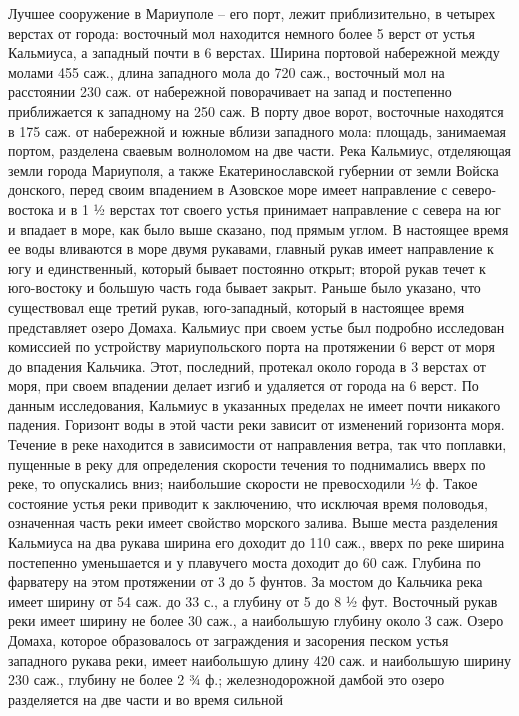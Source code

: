Лучшее сооружение в Мариуполе – его порт, лежит приблизительно, в четырех
верстах от города: восточный мол находится немного более 5 верст от устья
Кальмиуса, а западный почти в 6 верстах. Ширина портовой набережной между
молами 455 саж., длина западного мола до 720 саж., восточный мол на расстоянии
230 саж. от набережной поворачивает на запад и постепенно приближается к
западному на 250 саж. В порту двое  ворот, восточные находятся в 175 саж. от
набережной и южные вблизи западного мола: площадь, занимаемая портом, разделена
сваевым волноломом на две части. Река Кальмиус, отделяющая земли города
Мариуполя, а также Екатеринославской губернии от земли Войска донского, перед
своим впадением в Азовское море имеет направление с северо-востока и в 1 ½
верстах тот своего устья принимает направление с севера на юг и впадает в море,
как было выше сказано, под прямым углом. В настоящее время ее воды вливаются в
море двумя рукавами, главный рукав имеет направление к югу и единственный,
который бывает постоянно открыт; второй рукав течет к юго-востоку и большую
часть года бывает закрыт. Раньше было указано, что существовал еще третий
рукав, юго-западный, который в настоящее время представляет озеро Домаха.
Кальмиус при своем устье был подробно исследован комиссией по устройству
мариупольского порта на протяжении 6 верст от моря до впадения Кальчика. Этот,
последний, протекал около города в 3 верстах от моря, при своем впадении делает
изгиб и удаляется от города на 6 верст. По данным исследования, Кальмиус в
указанных пределах не имеет почти никакого падения. Горизонт воды в этой части
реки зависит от изменений горизонта моря. Течение в реке находится в
зависимости от направления ветра, так что поплавки, пущенные в реку для
определения скорости течения то поднимались вверх по реке, то опускались вниз;
наибольшие скорости не превосходили ½ ф. Такое состояние устья реки приводит к
заключению, что исключая время половодья, означенная часть  реки имеет свойство
морского залива. Выше места разделения Кальмиуса на два рукава ширина его
доходит до 110 саж., вверх по реке ширина постепенно уменьшается и у плавучего
моста доходит до 60 саж. Глубина по фарватеру на этом протяжении от 3 до 5
фунтов. За мостом до Кальчика река имеет ширину от 54 саж. до 33 с., а глубину
от 5 до 8 ½ фут. Восточный рукав реки имеет ширину не более  30 саж., а
наибольшую глубину  около 3\4 саж. Озеро Домаха, которое образовалось от
заграждения и засорения песком устья западного рукава реки, имеет наибольшую
длину 420 саж. и наибольшую ширину 230 саж., глубину не более 2 ¾ ф.;
железнодорожной дамбой это озеро разделяется на две части и во время сильной
